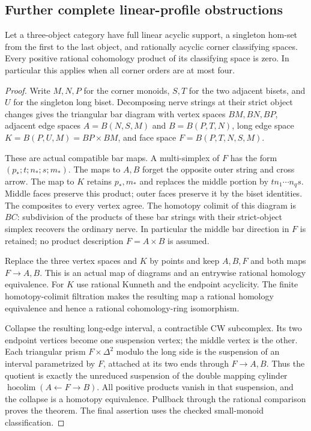 \subsection{Further complete linear-profile obstructions}

\begin{theorem}
\label{CP2:A-baseline-singleton-long}
Let a three-object category have full linear acyclic support,
a singleton hom-set from the first to the last object, and
rationally acyclic corner classifying spaces.  Every positive
rational cohomology product of its classifying space is zero.
In particular this applies when all corner orders are at most
four.
\end{theorem}
\begin{proof}
Write $M,N,P$ for the corner monoids, $S,T$ for the two
adjacent bisets, and $U$ for the singleton long biset.
Decomposing nerve strings at their strict object changes
gives the triangular bar diagram with vertex spaces
$BM,BN,BP$, adjacent edge spaces
$A=B(N,S,M)$ and $B=B(P,T,N)$, long edge space
$K=B(P,U,M)=BP\times BM$, and face space
$F=B(P,T,N,S,M)$.

These are actual compatible bar maps.  A multi-simplex of
$F$ has the form $(p_*;t;n_*;s;m_*)$.  The maps to $A,B$
forget the opposite outer string and cross arrow.  The map
to $K$ retains $p_*,m_*$ and replaces the middle portion
by $t n_1\cdots n_q s$.  Middle faces preserve this
product; outer faces preserve it by the biset identities.
The composites to every vertex agree.  The homotopy
colimit of this diagram is $BC$: subdivision of the
products of these bar strings with their strict-object
simplex recovers the ordinary nerve.  In particular the
middle bar direction in $F$ is retained; no product
description $F=A\times B$ is assumed.

Replace the three vertex spaces and $K$ by points and
keep $A,B,F$ and both maps $F\to A,B$.  This is an actual
map of diagrams and an entrywise rational homology
equivalence.  For $K$ use rational Kunneth and the
endpoint acyclicity.  The finite homotopy-colimit
filtration makes the resulting map a rational homology
equivalence and hence a rational cohomology-ring
isomorphism.

Collapse the resulting long-edge interval, a contractible
CW subcomplex.  Its two endpoint vertices become one
suspension vertex; the middle vertex is the other.
Each triangular prism $F\times\Delta^2$ modulo the
long side is the suspension of an interval parametrized
by $F$, attached at its two ends through $F\to A,B$.
Thus the quotient is exactly the unreduced suspension
of the double mapping cylinder
$\operatorname{hocolim}(A\leftarrow F\to B)$.
All positive products vanish in that suspension, and
the collapse is a homotopy equivalence.  Pullback
through the rational comparison proves the theorem.
The final assertion uses the checked small-monoid
classification.
\end{proof}

